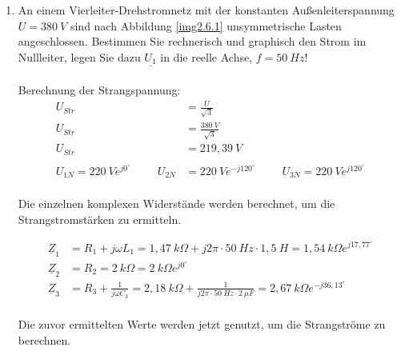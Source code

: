 \begin{enumerate}[label=\alph*)]
  \item\label{aufgabe2.5} An einem Vierleiter-Drehstromnetz mit der konstanten Außenleiterspannung $U = 380\ V$ sind nach Abbildung \ref{img2.6.1} unsymmetrische Lasten angeschlossen. Bestimmen Sie rechnerisch und graphisch den Strom im Nullleiter, legen Sie dazu $\underline{U_1}$ in die reelle Achse, $f = 50\ Hz$!
	\\ \ \\
  Berechnung  der Strangspannung:
	\begin{align*}
		U_{Str} &= \frac{U}{\sqrt{3}} \\
		U_{Str} &= \frac{380\ V}{\sqrt{3}}\\
		U_{Str} &= 219,39\ V\\ \ \\
		U_{1N}=220\ Ve^{j0^\circ} \hspace{1cm}
		U_{2N}&=220\ Ve^{-j120^\circ} \hspace{1cm}
		U_{3N}=220\ Ve^{j120^\circ}\\
	\end{align*}
		
	Die einzelnen komplexen Widerstände werden berechnet, um die Strangstromstärken zu ermitteln.
	
	\begin{align*}
		\underline{Z}_{1} &= R_{1} + j\omega L_{1} = 1,47\ k\Omega + j2\pi\cdot 50\ Hz\cdot1,5\ H = 1,54\ k\Omega e^{j17,77^\circ}\\
		\underline{Z}_{2} &= R_{2} = 2\ k\Omega = 2\ k\Omega e^{j0^\circ}\\
		\underline{Z}_{3} &= R_{3} + \frac{1}{j\omega C_{3}} = 2,18\ k\Omega + \frac{1}{j2\pi\cdot 50\ Hz\cdot2\ \mu F} = 2,67\ k\Omega e^{-j36,13^\circ}\\
	\end{align*}
	
	Die zuvor ermittelten Werte werden jetzt genutzt, um die Strangströme zu berechnen.
	

\end{enumerate}
